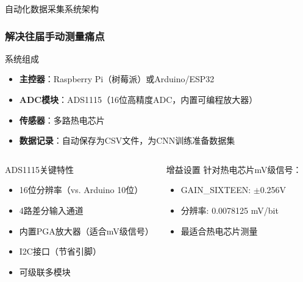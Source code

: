\documentclass[aspectratio=169,11pt]{ctexbeamer}
\begin{document}
\begin{frame}{自动化数据采集系统架构}
\frametitle{解决往届手动测量痛点}
\begin{block}{系统组成}
\begin{itemize}
    \item \textbf{主控器}：Raspberry Pi（树莓派）或Arduino/ESP32
    \item \textbf{ADC模块}：ADS1115（16位高精度ADC，内置可编程放大器）
    \item \textbf{传感器}：多路热电芯片
    \item \textbf{数据记录}：自动保存为CSV文件，为CNN训练准备数据集
\end{itemize}
\end{block}

\begin{columns}
\begin{block}{ADS1115关键特性}
\begin{itemize}
    \item 16位分辨率（vs. Arduino 10位）
    \item 4路差分输入通道
    \item 内置PGA放大器（适合mV级信号）
    \item I2C接口（节省引脚）
    \item 可级联多模块
\end{itemize}
\end{block}

\begin{block}{增益设置}
针对热电芯片mV级信号：
\begin{itemize}
    \item GAIN\_SIXTEEN: $\pm$0.256V
    \item 分辨率: 0.0078125 mV/bit
    \item 最适合热电芯片测量
\end{itemize}
\end{block}
\end{columns}
\end{frame}
\end{document}
